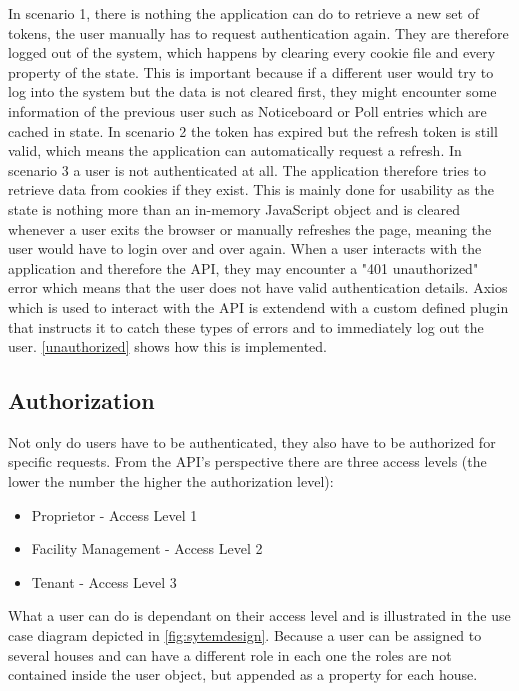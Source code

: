 In scenario 1, there is nothing the application can do to retrieve a new set of tokens, the user manually has to request authentication again. They are therefore logged out of the system, which happens by clearing every cookie file and every property of the state. This is important because if a different user would try to log into the system but the data is not cleared first, they might encounter some information of the previous user such as Noticeboard or Poll entries which are cached in state. In scenario 2 the token has expired but the refresh token is still valid, which means the application can automatically request a refresh. In scenario 3 a user is not authenticated at all. The application therefore tries to retrieve data from cookies if they exist. This is mainly done for usability as the state is nothing more than an in-memory JavaScript object and is cleared whenever a user exits the browser or manually refreshes the page, meaning the user would have to login over and over again. When a user interacts with the application and therefore the API, they may encounter a "401 unauthorized" error which means that the user does not have valid authentication details. Axios which is used to interact with the API is extendend with a custom defined plugin that instructs it to catch these types of errors and to immediately log out the user. \autoref{unauthorized} shows how this is implemented.

\subsection{Authorization}
Not only do users have to be authenticated, they also have to be authorized for specific requests. From the API's perspective there are three access levels (the lower the number the higher the authorization level): 

\begin{itemize}
  \item Proprietor - Access Level 1
  \item Facility Management - Access Level 2
  \item Tenant - Access Level 3
\end{itemize}

What a user can do is dependant on their access level and is illustrated in the use case diagram depicted in \autoref{fig:sytemdesign}.
Because a user can be assigned to several houses and can have a different role in each one the roles are not contained inside the user object, but appended as a property for each house.

